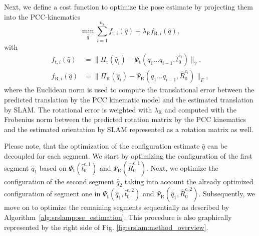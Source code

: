 Next, we define a cost function to optimize the pose estimate by projecting them into the \gls{PCC}-kinematics
%
\begin{equation}\label{eq:srslam:cost_fun}
    \min_{\hat{q}} \sum_{i=1}^{n_\mathrm{S}} f_{\mathrm{t},i}(\hat{q}) + \lambda_\mathrm{R} f_{\mathrm{R},i}(\hat{q}),
\end{equation}
with
\begin{equation}\label{eq:srslam:cost_fun_ingredients}
\begin{split}
    f_{\mathrm{t},i}(\hat{q}) &=
    \big\lVert 
    \Pi_\mathrm{t}(\hat{q}_i) - \Psi_\mathrm{t}(q_1 \dots q_{i-1}, \hat{t}_{0}^{\mathrm{c}_i})
    \big\rVert_2,\\
    f_{\mathrm{R},i}(\hat{q}) &=
    \big\lVert 
    \Pi_\mathrm{R}(\hat{q}_i) - \Psi_\mathrm{R}(q_1 \dots q_{i-1}, \hat{R}_{0}^{\mathrm{c}_i})
    \big\rVert_F,
\end{split}
\end{equation}
where the Euclidean norm is used to compute the translational error between the predicted translation by the \gls{PCC} kinematic model and the estimated translation by \gls{SLAM}. The rotational error is weighted with $\lambda_\mathrm{R}$ and computed with the Frobenius norm between the predicted rotation matrix by the \gls{PCC} kinematics and the estimated orientation by \gls{SLAM} represented as a rotation matrix as well.

Please note, that the optimization of the configuration estimate $\hat{q}$ can be decoupled for each segment. 
We start by optimizing the configuration of the first segment $\hat{q}_1$ based on $\Psi_\mathrm{t}(\hat{t}_{0}^{\mathrm{c},1})$ and $\Psi_\mathrm{R}(\hat{R}_{0}^{\mathrm{c},1})$. Next, we optimize the configuration of the second segment $\hat{q}_2$ taking into account the already optimized configuration of segment one in $\Psi_\mathrm{t}(\hat{q}_1, \hat{t}_{0}^{\mathrm{c},2})$ and $\Psi_\mathrm{R}(\hat{q}_1, \hat{R}_{0}^{\mathrm{c},2})$. 
Subsequently, we move on to optimize the remaining segments sequentially as described by Algorithm~\ref{alg:srslampose_estimation}. This procedure is also graphically represented by the right side of Fig. \ref{fig:srslam:method_overview}.

